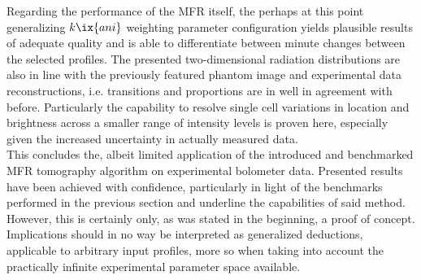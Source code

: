             Regarding the performance of the MFR itself, the perhaps at this point generalizing $k\ix{ani}$ weighting parameter configuration yields plausible results of adequate quality and is able to differentiate between minute changes between the selected profiles. The presented two-dimensional radiation distributions are also in line with the previously featured phantom image and experimental data reconstructions, i.e. transitions and proportions are in well in agreement with before. Particularly the capability to resolve single cell variations in location and brightness across a smaller range of intensity levels is proven here, especially given the increased uncertainty in actually measured data.\\%
%
            \newline%
            This concludes the, albeit limited application of the introduced and benchmarked MFR tomography algorithm on experimental bolometer data. Presented results have been achieved with confidence, particularly in light of the benchmarks performed in the previous section and underline the capabilities of said method. However, this is certainly only, as was stated in the beginning, a proof of concept. Implications should in no way be interpreted as generalized deductions, applicable to arbitrary input profiles, more so when taking into account the practically infinite experimental parameter space available.%
%
